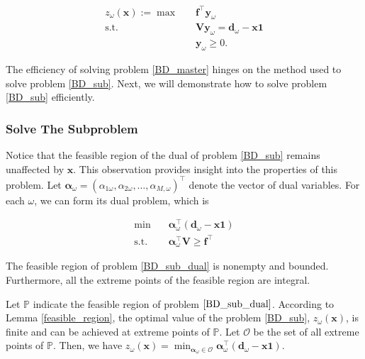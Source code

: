 \begin{equation}\label{BD_sub}
  \begin{aligned}
    z_{\omega}(\mathbf{x}) := \max \quad & \mathbf{f}^{\intercal} \mathbf{y}_{\omega} \\
    \text {s.t.} \quad & \mathbf{V} \mathbf{y}_{\omega} = \mathbf{d}_{\omega} - \mathbf{x} \mathbf{1} \\
     & \mathbf{y}_{\omega} \geq 0.
  \end{aligned}
\end{equation}


The efficiency of solving problem \eqref{BD_master} hinges on the method used to solve problem \eqref{BD_sub}. Next, we will demonstrate how to solve problem \eqref{BD_sub} efficiently.



\subsubsection{Solve The Subproblem}\label{second_stage}
Notice that the feasible region of the dual of problem \eqref{BD_sub} remains unaffected by $\mathbf{x}$. This observation provides insight into the properties of this problem. Let $\bm{\alpha}_{\omega} = (\alpha_{1\omega},\alpha_{2\omega}, \ldots, \alpha_{M,\omega})^{\intercal}$ denote the vector of dual variables. For each $\omega$, we can form its dual problem, which is 

\begin{equation}\label{BD_sub_dual}
  \begin{aligned}
    \min \quad & \bm{\alpha}_{\omega}^{\intercal} (\mathbf{d}_{\omega}- \mathbf{x} \mathbf{1}) \\
    \text {s.t.} \quad & \bm{\alpha}_{\omega}^{\intercal} \mathbf{V} \geq \mathbf{f}^{\intercal}
  \end{aligned}
\end{equation}

\begin{lem}\label{feasible_region}
 The feasible region of problem \eqref{BD_sub_dual} is nonempty and bounded. Furthermore, all the extreme points of the feasible region are integral.
\end{lem}

Let $\mathbb{P}$ indicate the feasible region of problem $\eqref{BD_sub_dual}$. According to Lemma \ref{feasible_region}, the optimal value of the problem \eqref{BD_sub}, $z_{\omega}(\mathbf{x})$, is finite and can be achieved at extreme points of $\mathbb{P}$. Let $\mathcal{O}$ be the set of all extreme points of $\mathbb{P}$. Then, we have $z_{\omega}(\mathbf{x}) = \min_{\bm{\alpha}_{\omega} \in \mathcal{O}} \bm{\alpha}_{\omega}^{\intercal}(\mathbf{d}_{\omega}- \mathbf{x} \mathbf{1})$.

